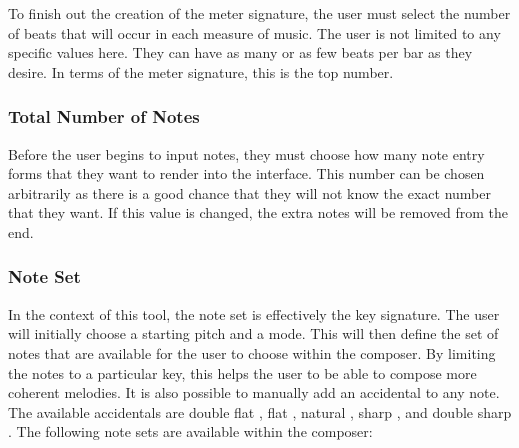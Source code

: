 To finish out the creation of the meter signature, the user must select the number of beats that will occur in each measure of music.  The user is not limited to any specific values here.  They can have as many or as few beats per bar as they desire.  In terms of the meter signature, this is the top number.

\subsubsection{Total Number of Notes}
\label{subsubsec:totalnumberofnotes}

Before the user begins to input notes, they must choose how many note entry forms that they want to render into the interface.  This number can be chosen arbitrarily as there is a good chance that they will not know the exact number that they want.  If this value is changed, the extra notes will be removed from the end.

\subsubsection{Note Set}
\label{subsubsec:noteset}

In the context of this tool, the note set is effectively the key signature.  The user will initially choose a starting pitch and a mode.  This will then define the set of notes that are available for the user to choose within the composer.  By limiting the notes to a particular key, this helps the user to be able to compose more coherent melodies.  It is also possible to manually add an accidental to any note.  The available accidentals are double flat \musDoubleFlat, flat \fl, natural \na, sharp \sh, and double sharp \musDoubleSharp.  The following note sets are available within the composer:

